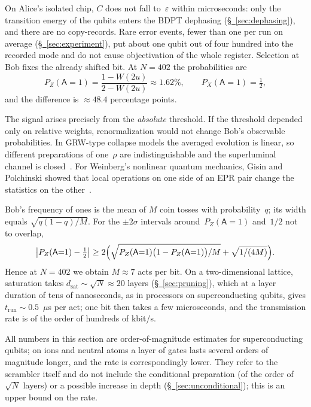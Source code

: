 \documentclass[11pt,a4paper]{article}
\newcommand{\qA}{\mathsf{A}}
\begin{document}
On Alice's isolated chip, $C$ does not fall to~$\varepsilon$ within microseconds: only the transition energy of the qubits enters the BDPT dephasing (\hyperref[sec:dephasing]{\S~\ref*{sec:dephasing}}), and there are no copy-records. Rare error events, fewer than one per run on average (\hyperref[sec:experiment]{\S~\ref*{sec:experiment}}), put about one qubit out of four hundred into the recorded mode and do not cause objectivation of the whole register. Selection at Bob fixes the already shifted bit. At $N=402$ the probabilities are
\begin{equation}
P_Z(\qA{=}1)=\frac{1-W(2u)}{2-W(2u)}\approx1.62\%,
\qquad
P_X(\qA{=}1)=\tfrac12,
\end{equation}
and the difference is $\approx48.4$ percentage points.

The signal arises precisely from the \emph{absolute} threshold. If the threshold depended only on relative weights, renormalization would not change Bob's observable probabilities. In GRW-type collapse models the averaged evolution is linear, so different preparations of one~$\rho$ are indistinguishable and the superluminal channel is closed~\cite{ghirardi1986,ghirardi1990,bassi2013}. For Weinberg's nonlinear quantum mechanics, Gisin and Polchinski showed that local operations on one side of an EPR pair change the statistics on the other~\cite{weinberg1989,gisin1990,polchinski1991}.

Bob's frequency of ones is the mean of $M$ coin tosses with probability~$q$; its width equals $\sqrt{q(1-q)/M}$. For the $\pm 2\sigma$ intervals around~$P_Z(\qA{=}1)$ and~$1/2$ not to overlap,
\begin{equation}
\bigl|P_Z(\qA{=}1)-\tfrac12\bigr|
\ge
2\Bigl(\sqrt{P_Z(\qA{=}1)\bigl(1-P_Z(\qA{=}1)\bigr)/M}+\sqrt{1/(4M)}\Bigr).
\end{equation}
Hence at $N=402$ we obtain $M\approx7$ acts per bit. On a two-dimensional lattice, saturation takes $d_{\mathrm{sat}}\sim\sqrt{N}\approx20$ layers (\hyperref[sec:pruning]{\S~\ref*{sec:pruning}}), which at a layer duration of tens of nanoseconds, as in processors on superconducting qubits, gives $t_{\mathrm{run}}\sim0.5$~$\mu$s per act; one bit then takes a few microseconds, and the transmission rate is of the order of hundreds of kbit/s.

All numbers in this section are order-of-magnitude estimates for superconducting qubits; on ions and neutral atoms a layer of gates lasts several orders of magnitude longer, and the rate is correspondingly lower. They refer to the scrambler itself and do not include the conditional preparation (of the order of~$\sqrt N$ layers) or a possible increase in depth (\hyperref[sec:unconditional]{\S~\ref*{sec:unconditional}}); this is an upper bound on the rate.
\end{document}
